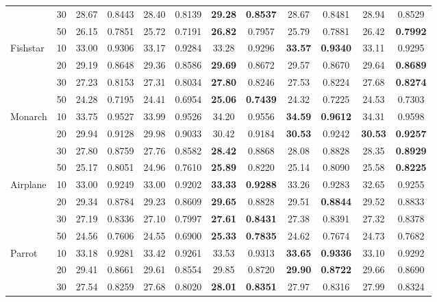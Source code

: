 \begin{table}[p]
{{\begin{tabular}{@{}ll*{5}{cc}@{}}
 & 30 & 28.67 & 0.8443 & 28.40 & 0.8139 & \textbf{29.28} & \textbf{0.8537} & 28.67 & 0.8481 & 28.94 & 0.8529 \\
 & 50 & 26.15 & 0.7851 & 25.72 & 0.7191 & \textbf{26.82} & 0.7957 & 25.79 & 0.7881 & 26.42 & \textbf{0.7992} \\
\addlinespace[0.15ex]
Fishstar & 10 & 33.00 & 0.9306 & 33.17 & 0.9284 & 33.28 & 0.9296 & \textbf{33.57} & \textbf{0.9340} & 33.11 & 0.9295 \\
 & 20 & 29.19 & 0.8648 & 29.36 & 0.8586 & \textbf{29.69} & 0.8672 & 29.57 & 0.8670 & 29.64 & \textbf{0.8689} \\
 & 30 & 27.23 & 0.8153 & 27.31 & 0.8034 & \textbf{27.80} & 0.8246 & 27.53 & 0.8224 & 27.68 & \textbf{0.8274} \\
 & 50 & 24.28 & 0.7195 & 24.41 & 0.6954 & \textbf{25.06} & \textbf{0.7439} & 24.32 & 0.7225 & 24.53 & 0.7303 \\
\addlinespace[0.15ex]
Monarch & 10 & 33.75 & 0.9527 & 33.99 & 0.9526 & 34.20 & 0.9556 & \textbf{34.59} & \textbf{0.9612} & 34.31 & 0.9598 \\
 & 20 & 29.94 & 0.9128 & 29.98 & 0.9033 & 30.42 & 0.9184 & \textbf{30.53} & 0.9242 & \textbf{30.53} & \textbf{0.9257} \\
 & 30 & 27.80 & 0.8759 & 27.76 & 0.8582 & \textbf{28.42} & 0.8868 & 28.08 & 0.8828 & 28.35 & \textbf{0.8929} \\
 & 50 & 25.17 & 0.8051 & 24.96 & 0.7610 & \textbf{25.89} & 0.8220 & 25.14 & 0.8090 & 25.58 & \textbf{0.8225} \\
\addlinespace[0.15ex]
Airplane & 10 & 33.00 & 0.9249 & 33.00 & 0.9202 & \textbf{33.33} & \textbf{0.9288} & 33.26 & 0.9283 & 32.65 & 0.9255 \\
 & 20 & 29.34 & 0.8784 & 29.23 & 0.8609 & \textbf{29.65} & 0.8828 & 29.51 & \textbf{0.8844} & 29.52 & 0.8833 \\
 & 30 & 27.19 & 0.8336 & 27.10 & 0.7997 & \textbf{27.61} & \textbf{0.8431} & 27.38 & 0.8391 & 27.32 & 0.8378 \\
 & 50 & 24.56 & 0.7606 & 24.55 & 0.6900 & \textbf{25.33} & \textbf{0.7835} & 24.62 & 0.7674 & 24.73 & 0.7682 \\
\addlinespace[0.15ex]
Parrot & 10 & 33.18 & 0.9281 & 33.42 & 0.9261 & 33.53 & 0.9313 & \textbf{33.65} & \textbf{0.9336} & 33.10 & 0.9292 \\
 & 20 & 29.41 & 0.8661 & 29.61 & 0.8554 & 29.85 & 0.8720 & \textbf{29.90} & \textbf{0.8722} & 29.66 & 0.8690 \\
 & 30 & 27.54 & 0.8259 & 27.68 & 0.8020 & \textbf{28.01} & \textbf{0.8351} & 27.97 & 0.8316 & 27.99 & 0.8324 \\

\end{tabular}}}
\end{table}
